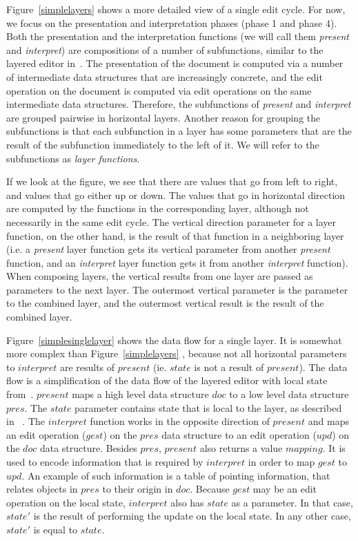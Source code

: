  Figure~\ref{simplelayers}  shows a more detailed view of a single edit cycle. For now, we focus on the presentation and interpretation phases (phase 1 and phase 4). Both the presentation and the interpretation functions (we will call them {\em present} and {\em interpret}) are compositions of a number of subfunctions, similar to the layered editor in~\cite{architecture}. The presentation of the document is computed via a number of intermediate data structures that are increasingly concrete, and the edit operation on the document is computed via edit operations on the same intermediate data structures. Therefore, the subfunctions of {\em present} and {\em interpret} are grouped pairwise in horizontal layers. Another reason for grouping the subfunctions is that each subfunction in a layer has some parameters that are the result of the subfunction immediately to the left of it. We will refer to the subfunctions as {\em layer functions}.

If we look at the figure, we see that there are values that go from left to right, and values that go either up or down. The values that go in horizontal direction are computed by the functions in the corresponding layer, although not necessarily in the same edit cycle. The vertical direction parameter for a layer function, on the other hand, is the result of that function in a neighboring layer (i.e. a {\em present} layer function gets its vertical parameter from another {\em present} function, and an {\em interpret} layer function gets it from another {\em interpret} function). When composing layers, the vertical results from one layer are passed as parameters to the next layer. The outermost vertical parameter is the parameter to the combined layer, and the outermost vertical result is the result of the combined layer. 


Figure~\ref{simplesinglelayer} shows the data flow for a single layer. It is somewhat more complex than Figure~\ref{simplelayers} , because not all horizontal parameters to $interpret$ are results of $present$  (ie. $state$ is not a result of $present$). The data flow is a simplification of the data flow of the layered editor with local state from~\cite{architecture}. $present$ maps a high level data structure $doc$ to a low level data structure $pres$. The $state$ parameter contains state that is local to the layer, as described in~\cite{architecture} . The $interpret$ function works in the opposite direction of $present$ and maps an edit operation ($gest$) on the $pres$ data structure to an edit operation ($upd$) on the $doc$ data structure. Besides $pres$, $present$ also returns a value $mapping$. It is used to encode information that is required by $interpret$ in order to map $gest$ to $upd$. An example of such information is a table of pointing information, that relates objects in $pres$ to their origin in $doc$. Because $gest$ may be an edit operation on the local state, $interpret$ also has $state$ as a parameter. In that case, $state'$ is the result of performing the update on the local state. In any other case, $state'$ is equal to $state$. 

